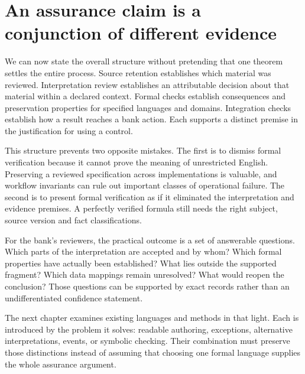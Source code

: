 \section{An assurance claim is a conjunction of different evidence}
\label{merge:M03:12}

\label{sec:proof-assurance}
We can now state the overall structure without pretending that one theorem
settles the entire process. Source retention establishes which material was
reviewed. Interpretation review establishes an attributable decision about that
material within a declared context. Formal checks establish consequences and
preservation properties for specified languages and domains. Integration checks
establish how a result reaches a bank action. Each supports a distinct premise
in the justification for using a control.

This structure prevents two opposite mistakes. The first is to dismiss formal
verification because it cannot prove the meaning of unrestricted English.
Preserving a reviewed specification across implementations is valuable, and
workflow invariants can rule out important classes of operational failure. The
second is to present formal verification as if it eliminated the interpretation
and evidence premises. A perfectly verified formula still needs the right
subject, source version and fact classifications.


For the bank's reviewers, the practical outcome is a set of answerable
questions. Which parts of the interpretation are accepted and by whom? Which
formal properties have actually been established? What lies outside the
supported fragment? Which data mappings remain unresolved? What would reopen
the conclusion? Those questions can be supported by exact records rather than
an undifferentiated confidence statement.

The next chapter examines existing languages and methods in that light. Each
is introduced by the problem it solves: readable authoring, exceptions,
alternative interpretations, events, or symbolic checking. Their combination
must preserve those distinctions instead of assuming that choosing one formal
language supplies the whole assurance argument.


